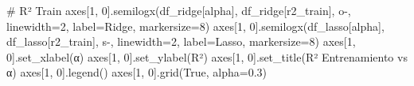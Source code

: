 \documentclass[
  doc,
  floatsintext,
  longtable,
  a4paper,
  nolmodern,
  notxfonts,
  notimes,
  12pt,
  colorlinks=true,linkcolor=blue,citecolor=blue,urlcolor=blue]{apa7}
\newenvironment{Shaded}{\begin{snugshade}}{\end{snugshade}}
\newcommand{\CommentTok}[1]{\textcolor[rgb]{0.37,0.37,0.37}{#1}}
\newcommand{\DecValTok}[1]{\textcolor[rgb]{0.68,0.00,0.00}{#1}}
\newcommand{\FloatTok}[1]{\textcolor[rgb]{0.68,0.00,0.00}{#1}}
\newcommand{\NormalTok}[1]{\textcolor[rgb]{0.00,0.23,0.31}{#1}}
\newcommand{\OperatorTok}[1]{\textcolor[rgb]{0.37,0.37,0.37}{#1}}
\newcommand{\StringTok}[1]{\textcolor[rgb]{0.13,0.47,0.30}{#1}}
\newcommand{\VariableTok}[1]{\textcolor[rgb]{0.07,0.07,0.07}{#1}}
\begin{document}
\begin{Shaded}
\begin{Highlighting}[]
\CommentTok{\# R² Train}
\NormalTok{axes[}\DecValTok{1}\NormalTok{, }\DecValTok{0}\NormalTok{].semilogx(df\_ridge[}\StringTok{\textquotesingle{}alpha\textquotesingle{}}\NormalTok{], df\_ridge[}\StringTok{\textquotesingle{}r2\_train\textquotesingle{}}\NormalTok{], }
                    \StringTok{\textquotesingle{}o{-}\textquotesingle{}}\NormalTok{, linewidth}\OperatorTok{=}\DecValTok{2}\NormalTok{, label}\OperatorTok{=}\StringTok{\textquotesingle{}Ridge\textquotesingle{}}\NormalTok{, markersize}\OperatorTok{=}\DecValTok{8}\NormalTok{)}
\NormalTok{axes[}\DecValTok{1}\NormalTok{, }\DecValTok{0}\NormalTok{].semilogx(df\_lasso[}\StringTok{\textquotesingle{}alpha\textquotesingle{}}\NormalTok{], df\_lasso[}\StringTok{\textquotesingle{}r2\_train\textquotesingle{}}\NormalTok{], }
                    \StringTok{\textquotesingle{}s{-}\textquotesingle{}}\NormalTok{, linewidth}\OperatorTok{=}\DecValTok{2}\NormalTok{, label}\OperatorTok{=}\StringTok{\textquotesingle{}Lasso\textquotesingle{}}\NormalTok{, markersize}\OperatorTok{=}\DecValTok{8}\NormalTok{)}
\NormalTok{axes[}\DecValTok{1}\NormalTok{, }\DecValTok{0}\NormalTok{].set\_xlabel(}\StringTok{\textquotesingle{}α\textquotesingle{}}\NormalTok{)}
\NormalTok{axes[}\DecValTok{1}\NormalTok{, }\DecValTok{0}\NormalTok{].set\_ylabel(}\StringTok{\textquotesingle{}R²\textquotesingle{}}\NormalTok{)}
\NormalTok{axes[}\DecValTok{1}\NormalTok{, }\DecValTok{0}\NormalTok{].set\_title(}\StringTok{\textquotesingle{}R² Entrenamiento vs α\textquotesingle{}}\NormalTok{)}
\NormalTok{axes[}\DecValTok{1}\NormalTok{, }\DecValTok{0}\NormalTok{].legend()}
\NormalTok{axes[}\DecValTok{1}\NormalTok{, }\DecValTok{0}\NormalTok{].grid(}\VariableTok{True}\NormalTok{, alpha}\OperatorTok{=}\FloatTok{0.3}\NormalTok{)}


\end{Highlighting}
\end{Shaded}
\end{document}
